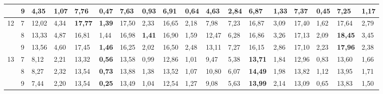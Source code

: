 \documentclass[conference]{IEEEtran}
\begin{document}
\begin{table}[]
\begin{tabular}{|cl|ll|ll|ll|ll|ll|ll|ll|ll|}
		\multicolumn{1}{|c|}{} & 9 & \multicolumn{1}{l|}{4,35} & 1,07 & \multicolumn{1}{l|}{\textbf{7,76}} & 0,47 & \multicolumn{1}{l|}{7,63} & 0,93 & \multicolumn{1}{l|}{6,91} & 0,64 & \multicolumn{1}{l|}{4,63} & 2,84 & \multicolumn{1}{l|}{6,87} & 1,33 & \multicolumn{1}{l|}{7,37} & \textbf{0,45} & \multicolumn{1}{l|}{7,25} & 1,17 \\ \hline
		\multicolumn{1}{|c|}{\multirow{3}{*}{12}} & 7 & \multicolumn{1}{l|}{12,02} & 4,34 & \multicolumn{1}{l|}{\textbf{17,77}} & \textbf{1,39} & \multicolumn{1}{l|}{17,50} & 2,33 & \multicolumn{1}{l|}{16,65} & 2,18 & \multicolumn{1}{l|}{7,98} & 7,23 & \multicolumn{1}{l|}{16,87} & 3,09 & \multicolumn{1}{l|}{17,40} & 1,62 & \multicolumn{1}{l|}{17,64} & 2,79 \\ \cline{2-18} 
		\multicolumn{1}{|c|}{} & 8 & \multicolumn{1}{l|}{13,33} & 4,87 & \multicolumn{1}{l|}{16,81} & 1,44 & \multicolumn{1}{l|}{16,98} & \textbf{1,41} & \multicolumn{1}{l|}{16,90} & 1,59 & \multicolumn{1}{l|}{12,47} & 6,28 & \multicolumn{1}{l|}{16,86} & 3,26 & \multicolumn{1}{l|}{17,13} & 2,09 & \multicolumn{1}{l|}{\textbf{18,45}} & 3,45 \\ \cline{2-18} 
		\multicolumn{1}{|c|}{} & 9 & \multicolumn{1}{l|}{13,56} & 4,60 & \multicolumn{1}{l|}{17,45} & \textbf{1,46} & \multicolumn{1}{l|}{16,25} & 2,02 & \multicolumn{1}{l|}{16,50} & 2,48 & \multicolumn{1}{l|}{13,11} & 7,27 & \multicolumn{1}{l|}{16,15} & 2,86 & \multicolumn{1}{l|}{17,10} & 2,23 & \multicolumn{1}{l|}{\textbf{17,96}} & 2,38 \\ \hline
		\multicolumn{1}{|c|}{\multirow{3}{*}{13}} & 7 & \multicolumn{1}{l|}{8,12} & 2,21 & \multicolumn{1}{l|}{13,32} & \textbf{0,56} & \multicolumn{1}{l|}{13,58} & 0,99 & \multicolumn{1}{l|}{12,86} & 1,01 & \multicolumn{1}{l|}{9,47} & 5,38 & \multicolumn{1}{l|}{\textbf{13,71}} & 1,84 & \multicolumn{1}{l|}{12,96} & 0,83 & \multicolumn{1}{l|}{13,60} & 1,66 \\ \cline{2-18} 
		\multicolumn{1}{|c|}{} & 8 & \multicolumn{1}{l|}{8,27} & 2,32 & \multicolumn{1}{l|}{13,54} & \textbf{0,73} & \multicolumn{1}{l|}{13,88} & 1,38 & \multicolumn{1}{l|}{13,52} & 1,07 & \multicolumn{1}{l|}{10,80} & 6,07 & \multicolumn{1}{l|}{\textbf{14,49}} & 1,98 & \multicolumn{1}{l|}{13,82} & 1,12 & \multicolumn{1}{l|}{13,95} & 1,71 \\ \cline{2-18} 
		\multicolumn{1}{|c|}{} & 9 & \multicolumn{1}{l|}{7,44} & 2,20 & \multicolumn{1}{l|}{13,54} & \textbf{0,25} & \multicolumn{1}{l|}{13,49} & 1,04 & \multicolumn{1}{l|}{12,54} & 1,27 & \multicolumn{1}{l|}{9,08} & 5,63 & \multicolumn{1}{l|}{\textbf{13,99}} & 2,14 & \multicolumn{1}{l|}{13,09} & 0,65 & \multicolumn{1}{l|}{13,83} & 1,50 \\ \hline

\end{tabular}
\end{table}
\end{document}
